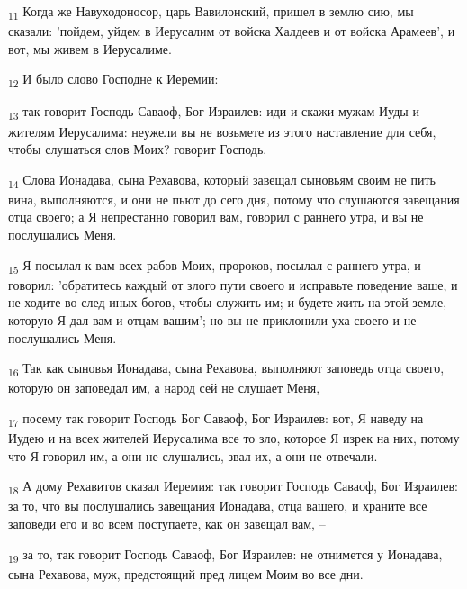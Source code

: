 \begin{tcolorbox}
\textsubscript{11} Когда же Навуходоносор, царь Вавилонский, пришел в землю сию, мы сказали: 'пойдем, уйдем в Иерусалим от войска Халдеев и от войска Арамеев', и вот, мы живем в Иерусалиме.
\end{tcolorbox}
\begin{tcolorbox}
\textsubscript{12} И было слово Господне к Иеремии:
\end{tcolorbox}
\begin{tcolorbox}
\textsubscript{13} так говорит Господь Саваоф, Бог Израилев: иди и скажи мужам Иуды и жителям Иерусалима: неужели вы не возьмете из этого наставление для себя, чтобы слушаться слов Моих? говорит Господь.
\end{tcolorbox}
\begin{tcolorbox}
\textsubscript{14} Слова Ионадава, сына Рехавова, который завещал сыновьям своим не пить вина, выполняются, и они не пьют до сего дня, потому что слушаются завещания отца своего; а Я непрестанно говорил вам, говорил с раннего утра, и вы не послушались Меня.
\end{tcolorbox}
\begin{tcolorbox}
\textsubscript{15} Я посылал к вам всех рабов Моих, пророков, посылал с раннего утра, и говорил: 'обратитесь каждый от злого пути своего и исправьте поведение ваше, и не ходите во след иных богов, чтобы служить им; и будете жить на этой земле, которую Я дал вам и отцам вашим'; но вы не приклонили уха своего и не послушались Меня.
\end{tcolorbox}
\begin{tcolorbox}
\textsubscript{16} Так как сыновья Ионадава, сына Рехавова, выполняют заповедь отца своего, которую он заповедал им, а народ сей не слушает Меня,
\end{tcolorbox}
\begin{tcolorbox}
\textsubscript{17} посему так говорит Господь Бог Саваоф, Бог Израилев: вот, Я наведу на Иудею и на всех жителей Иерусалима все то зло, которое Я изрек на них, потому что Я говорил им, а они не слушались, звал их, а они не отвечали.
\end{tcolorbox}
\begin{tcolorbox}
\textsubscript{18} А дому Рехавитов сказал Иеремия: так говорит Господь Саваоф, Бог Израилев: за то, что вы послушались завещания Ионадава, отца вашего, и храните все заповеди его и во всем поступаете, как он завещал вам, --
\end{tcolorbox}
\begin{tcolorbox}
\textsubscript{19} за то, так говорит Господь Саваоф, Бог Израилев: не отнимется у Ионадава, сына Рехавова, муж, предстоящий пред лицем Моим во все дни.
\end{tcolorbox}

